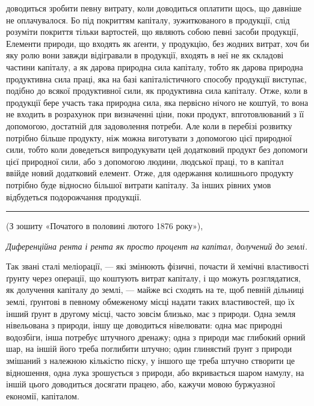 \parcont{}  %
доводиться зробити певну витрату, коли доводиться оплатити щось, що давніше
не оплачувалося. Бо під покриттям капіталу, зужиткованого в продукції, слід
розуміти покриття тільки вартостей, що являють собою певні засоби продукції,
Елементи природи, що входять як аґенти, у продукцію, без жодних витрат,
хоч би яку ролю вони завжди відігравали в продукції, входять в неї не як складові
частини капіталу, а як дарова природна сила капіталу, тобто як дарова природна
продуктивна сила праці, яка на базі капіталістичного способу продукції
виступає, подібно до всякої продуктивної сили, як продуктивна сила капіталу.
Отже, коли в продукції бере участь така природна сила, яка первісно
нічого не коштуй, то вона не входить в розрахунок при визначенні ціни, поки
продукт, впготовлюваний з її допомогою, достатній для задоволення потреби.
Але коли в перебізі розвитку потрібно більше продукту, ніж можна виготувати
з допомогою цієї природної сили, тобто коли доведеться випродукувати
цей додатковий продукт без допомоги цієї природної сили, або з допомогою
людини, людської праці, то в капітал ввійде новий додатковий елемент. Отже,
для одержання колишнього продукту потрібно буде відносно більшої витрати
капіталу. За інших рівних умов відбудеться подорожчання продукції.

\pfbreak

(З зошиту «Початого в половині лютого 1876 року»),

\emph{Диференційна рента і рента як просто процент на капітал,
долучений до землі.}

Так звані сталі меліорації, — які змінюють фізичні, почасти й хемічні
властивості ґрунту через операції, що коштують витрат капіталу, і що можуть
розглядатися, як долучення капіталу до землі, — майже всі сходять на те,
щоб певній дільниці землі, ґрунтові в певному обмеженому місці надати таких
властивостей, що їх інший ґрунт в другому місці, часто зовсім близько, має
з природи. Одна земля нівельована з природи, іншу ще доводиться нівелювати:
одна має природні водозбіги, інша потребує штучного дренажу; одна з природи
має глибокий орний шар, на іншій його треба поглибити штучно; один глинястий
ґрунт з природи змішаний з належною кількістю піску, у іншого ще
треба штучно створити це відношення, одна лука зрошується з природи, або
вкривається шаром намулу, на іншій цього доводиться досягати працею, або,
кажучи мовою буржуазної економії, капіталом.

